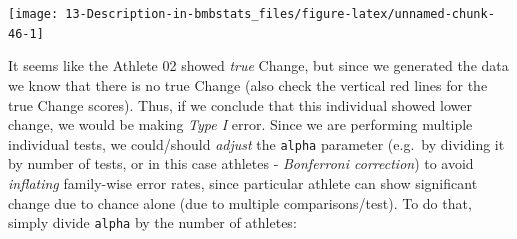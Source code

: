 \documentclass[
]{book}
\newenvironment{Shaded}{\begin{snugshade}}{\end{snugshade}}
\newcommand{\CommentTok}[1]{\textcolor[rgb]{0.56,0.35,0.01}{\textit{#1}}}
\newcommand{\DataTypeTok}[1]{\textcolor[rgb]{0.13,0.29,0.53}{#1}}
\newcommand{\DecValTok}[1]{\textcolor[rgb]{0.00,0.00,0.81}{#1}}
\newcommand{\FloatTok}[1]{\textcolor[rgb]{0.00,0.00,0.81}{#1}}
\newcommand{\KeywordTok}[1]{\textcolor[rgb]{0.13,0.29,0.53}{\textbf{#1}}}
\newcommand{\NormalTok}[1]{#1}
\newcommand{\OperatorTok}[1]{\textcolor[rgb]{0.81,0.36,0.00}{\textbf{#1}}}
\newcommand{\OtherTok}[1]{\textcolor[rgb]{0.56,0.35,0.01}{#1}}
\newcommand{\StringTok}[1]{\textcolor[rgb]{0.31,0.60,0.02}{#1}}
\begin{document}
\begin{Shaded}
\end{Shaded}

\begin{center}\texttt{[image: 13-Description-in-bmbstats\_files/figure-latex/unnamed-chunk-46-1]} \end{center}

It seems like the Athlete 02 showed \emph{true} Change, but since we generated the data we know that there is no true Change (also check the vertical red lines for the true Change scores). Thus, if we conclude that this individual showed lower change, we would be making \emph{Type I} error. Since we are performing multiple individual tests, we could/should \emph{adjust} the \texttt{alpha} parameter (e.g.~by dividing it by number of tests, or in this case athletes - \emph{Bonferroni correction}) to avoid \emph{inflating} family-wise error rates, since particular athlete can show significant change due to chance alone (due to multiple comparisons/test). To do that, simply divide \texttt{alpha} by the number of athletes:
\end{document}
